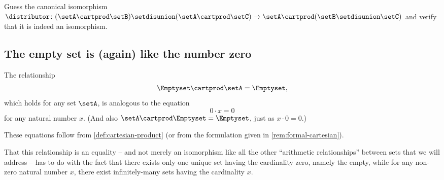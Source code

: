 \begin{exercise}\label{ex:distributivity-isomorphism}
    Guess the canonical isomorphism $\distributor \colon (\setA \cartprod \setB) \setdisunion (\setA \cartprod \setC) \to \setA \cartprod (\setB \setdisunion \setC)$ and verify that it is indeed an isomorphism.
\end{exercise}

\begin{solution}
\end{solution}

\subsection{The empty set is (again) like the number zero}

The relationship
\begin{equation}\label{eq:emptyset-is-zero}
    \Emptyset \cartprod \setA  = \Emptyset,
\end{equation}
which holds for any set $\setA$, is analogous to the equation
\begin{equation}
    0 \cdot x = 0
\end{equation}
for any natural number $x$. (And also $\setA \cartprod \Emptyset  = \Emptyset$, just as $x \cdot 0 = 0$.)

These equations follow from \cref{def:cartesian-product} (or from the formulation given in \cref{rem:formal-cartesian}).


That this relationship is an equality -- and not merely an isomorphism like all the other ``arithmetic relationships'' between sets that we will address -- has to do with the fact that there exists only one unique set having the cardinality zero, namely the empty, while for any non-zero natural number $x$, there exist infinitely-many sets having the cardinality $x$.

